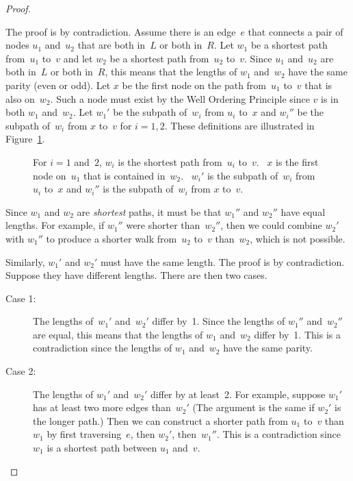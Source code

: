 \begin{editingnotes}
\begin{proof}
\begin{description}
The proof is by contradiction.  Assume there is an edge~$e$ that
connects a pair of nodes $u_1$ and~$u_2$ that are both in~$L$ or both
in~$R$.  Let $w_1$ be a shortest path from~$u_1$ to~$v$ and let $w_2$
be a shortest path from~$u_2$ to~$v$.  Since $u_1$ and~$u_2$ are both
in~$L$ or both in~$R$, this means that the lengths of $w_1$ and~$w_2$
have the same parity (even or odd).  Let $x$ be the first node on the
path from~$u_1$ to~$v$ that is also on~$w_2$.  Such a node must exist
by the Well Ordering Principle since $v$ is in both $w_1$ and~$w_2$.
Let $w_1'$ be the subpath of~$w_i$ from $u_i$ to~$x$ and $w_i''$ be
the subpath of~$w_i$ from $x$ to~$v$ for $i = 1, 2$.  These
definitions are illustrated in Figure~\ref{fig:XY3}.

\begin{figure}



\caption{For $i = 1$ and~$2$, $w_i$ is the shortest path from~$u_i$
  to~$v$.  \ $x$ is the first node on~$u_1$ that is contained
  in~$w_2$. \ $w_i'$ is the subpath of~$w_i$ from $u_i$ to~$x$ and
  $w_i''$ is the subpath of~$w_i$ from $x$ to~$v$.}

\label{fig:XY3}

\end{figure}

Since $w_1$ and $w_2$ are \emph{shortest} paths, it must be that
$w_1''$ and $w_2''$ have equal lengths. For example, if $w_1''$ were
shorter than~$w_2''$, then we could combine $w_2'$ with $w_1''$ to
produce a shorter walk from~$u_2$ to~$v$ than~$w_2$, which is not
possible.

Similarly, $w_1'$ and $w_2'$ must have the same length.  The proof is
by contradiction.  Suppose they have different lengths.  There are
then two cases.

\begin{description}

\item[Case 1:]
The lengths of~$w_1'$ and~$w_2'$ differ by~1.  Since the lengths of
$w_1''$ and~$w_2''$ are equal, this means that the lengths of $w_1$
and~$w_2$ differ by~1.  This is a contradiction since the lengths of
$w_1$ and~$w_2$ have the same parity.

\item[Case 2:]
The lengths of $w_1'$ and~$w_2'$ differ by at least~2.  For example,
suppose $w_1'$ has at least two more edges than~$w_2'$  (The argument
is the same if $w_2'$ is the longer path.)  Then we can construct a
shorter path from $u_1$ to~$v$ than~$w_1$ by first traversing~$e$,
then $w_2'$, then~$w_1''$.  This is a contradiction since $w_1$ is a
shortest path between $u_1$ and~$v$.


\end{description}
\end{description}
\end{proof}
\end{editingnotes}
